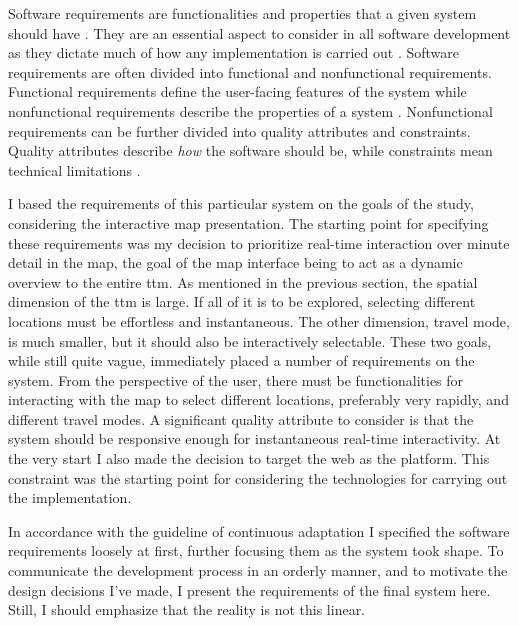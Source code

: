 
Software requirements are functionalities and properties
that a given system should have \parencite{chu2009}.
They are an essential aspect to consider in all software development
as they dictate much of how any implementation is carried out \parencite{saq2020}.
Software requirements are often divided into
functional and nonfunctional requirements.
Functional requirements define the user-facing features of the system
while nonfunctional requirements describe the properties of a system
\parencite{chu2009}.
Nonfunctional requirements can be further divided into
quality attributes and constraints.
Quality attributes describe \textit{how} the software should be,
while constraints mean technical limitations \parencite{chu2009}.

I based the requirements of this particular system on the goals of the study,
considering the interactive map presentation.
The starting point for specifying these requirements
was my decision to prioritize real-time interaction over minute detail in the map,
the goal of the map interface being to act as a dynamic overview to the entire \acrshort{ttm}.
As mentioned in the previous section,
the spatial dimension of the \acrshort{ttm} is large.
If all of it is to be explored,
selecting different locations must be effortless and instantaneous.
The other dimension, travel mode, is much smaller,
but it should also be interactively selectable.
These two goals, while still quite vague,
immediately placed a number of requirements on the system.
From the perspective of the user,
there must be functionalities for interacting with the map to
select different locations, preferably very rapidly,
and different travel modes.
A significant quality attribute to consider is that the system should
be responsive enough for instantaneous real-time interactivity.
At the very start I also made the decision to target the web as the platform.
This constraint was the starting point for considering the technologies
for carrying out the implementation.

In accordance with the guideline of continuous adaptation
\parencite{bec2001} I specified the software requirements loosely at first,
further focusing them as the system took shape.
To communicate the development process in an orderly manner,
and to motivate the design decisions I've made, I present
the requirements of the final system here.
Still, I should emphasize that the reality is not this linear.

